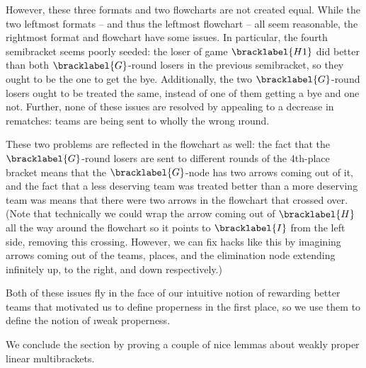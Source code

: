 {    


    However, these three formats and two flowcharts are not created equal. While the two leftmost formats -- and thus the leftmost flowchart -- all seem reasonable, the rightmost format and flowchart have some issues. In particular, the fourth semibracket seems poorly seeded: the loser of game $\bracklabel{H1}$ did better than both $\bracklabel{G}$-round losers in the previous semibracket, so they ought to be the one to get the bye. Additionally, the two $\bracklabel{G}$-round losers ought to be treated the same, instead of one of them getting a bye and one not. Further, none of these issues are resolved by appealing to a decrease in rematches: teams are being sent to wholly the wrong \i{round}.

    These two problems are reflected in the flowchart as well: the fact that the $\bracklabel{G}$-round losers are sent to different rounds of the 4th-place bracket means that the $\bracklabel{G}$-node has two arrows coming out of it, and the fact that a less deserving team was treated better than a more deserving team was means that there were two arrows in the flowchart that crossed over. (Note that technically we could wrap the arrow coming out of $\bracklabel{H}$ all the way around the flowchart so it points to $\bracklabel{I}$ from the left side, removing this crossing. However, we can fix hacks like this by imagining arrows coming out of the teams, places, and the elimination node extending infinitely up, to the right, and down respectively.)

    Both of these issues fly in the face of our intuitive notion of rewarding better teams that motivated us to define properness in the first place, so we use them to define the notion of \i{weak properness}.


    We conclude the section by proving a couple of nice lemmas about weakly proper linear multibrackets.


}
